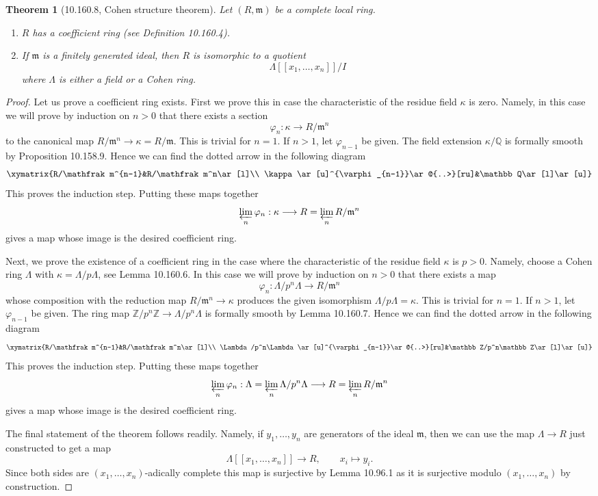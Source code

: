 \documentclass[UTF8,11pt]{ctexart}
\newtheorem*{theorem}{Theorem}
\theoremstyle{definition}
\newcommand{\Z}{\mathbb Z}
\newcommand{\Q}{\mathbb Q}
\begin{document}
\begin{theorem}[10.160.8, Cohen structure theorem]
Let $(R,\mathfrak m)$ be a complete local ring.
\begin{enumerate}
\item $R$ has a coefficient ring (see Definition 10.160.4).
\item If $\mathfrak m$ is a finitely generated ideal, then $R$ is isomorphic to a quotient
\[
\Lambda[[x_1,\ldots,x_n]]/I
\]
where $\Lambda$ is either a field or a Cohen ring.
\end{enumerate}
\end{theorem}
\begin{proof}
Let us prove a coefficient ring exists. First we prove this in case the characteristic of the residue field $\kappa$ is zero. Namely, in this case we will prove by induction on $n>0$ that there exists a section
\[
\varphi_n:\kappa\longrightarrow R/\mathfrak m^n
\]
to the canonical map $R/\mathfrak m^n\to\kappa=R/\mathfrak m$. This is trivial for $n=1$. If $n>1$, let $\varphi_{n-1}$ be given. The field extension $\kappa/\Q$ is formally smooth by Proposition 10.158.9. Hence we can find the dotted arrow in the following diagram
\[
\xymatrix{R/\mathfrak m^{n-1}&R/\mathfrak m^n\ar[l]\\
\kappa\ar[u]^{\varphi_{n-1}}\ar@{..>}[ru]&\Q\ar[l]\ar[u]}
\]
This proves the induction step. Putting these maps together
\[
\varprojlim_n\varphi_n:\kappa\longrightarrow R=\varprojlim_nR/\mathfrak m^n
\]
gives a map whose image is the desired coefficient ring.

Next, we prove the existence of a coefficient ring in the case where the characteristic of the residue field $\kappa$ is $p>0$. Namely, choose a Cohen ring $\Lambda$ with $\kappa=\Lambda/p\Lambda$, see Lemma 10.160.6. In this case we will prove by induction on $n>0$ that there exists a map
\[
\varphi_n:\Lambda/p^n\Lambda\longrightarrow R/\mathfrak m^n
\]
whose composition with the reduction map $R/\mathfrak m^n\to\kappa$ produces the given isomorphism $\Lambda/p\Lambda=\kappa$. This is trivial for $n=1$. If $n>1$, let $\varphi_{n-1}$ be given. The ring map $\Z/p^n\Z\to\Lambda/p^n\Lambda$ is formally smooth by Lemma 10.160.7. Hence we can find the dotted arrow in the following diagram
\[
\xymatrix{R/\mathfrak m^{n-1}&R/\mathfrak m^n\ar[l]\\
\Lambda/p^n\Lambda\ar[u]^{\varphi_{n-1}}\ar@{..>}[ru]&\Z/p^n\Z\ar[l]\ar[u]}
\]
This proves the induction step. Putting these maps together
\[
\varprojlim_n\varphi_n:\Lambda=\varprojlim_n\Lambda/p^n\Lambda\longrightarrow R=\varprojlim_nR/\mathfrak m^n
\]
gives a map whose image is the desired coefficient ring.

The final statement of the theorem follows readily. Namely, if $y_1,\ldots,y_n$ are generators of the ideal $\mathfrak m$, then we can use the map $\Lambda\to R$ just constructed to get a map
\[
\Lambda[[x_1,\ldots,x_n]]\longrightarrow R,\qquad x_i\longmapsto y_i.
\]
Since both sides are $(x_1,\ldots,x_n)$-adically complete this map is surjective by Lemma 10.96.1 as it is surjective modulo $(x_1,\ldots,x_n)$ by construction.
\end{proof}
\end{document}
